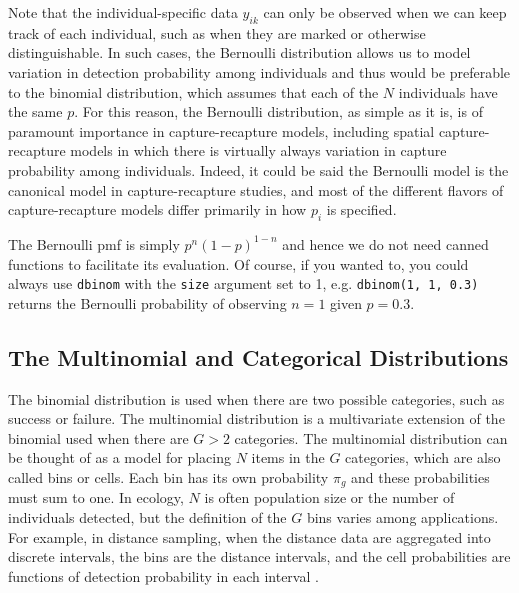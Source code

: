 Note that the individual-specific data $y_{ik}$ can only be
observed when we can keep track of each individual, such as when they
are marked or otherwise distinguishable.
In such cases, the Bernoulli distribution allows us to
model variation in detection probability among individuals and thus
would be preferable to the binomial distribution, which assumes that each
of the $N$ individuals have the same $p$.
For this reason, the Bernoulli
distribution, as simple as it is, is of paramount importance in
capture-recapture models, including spatial capture-recapture models
in which there is virtually always variation in capture probability
among individuals. Indeed, it could be said the Bernoulli model is the
canonical model in capture-recapture studies, and most of the
different flavors of capture-recapture models differ primarily in how $p_i$ is
specified. %

The Bernoulli pmf is simply $p^n(1-p)^{1-n}$ and hence we do not need canned
functions to facilitate its evaluation. Of course, if you wanted to, you
could always use \verb+dbinom+ with the \verb+size+ argument set to
1, e.g. \verb+dbinom(1, 1, 0.3)+ returns the Bernoulli probability of
observing $n=1$ given $p=0.3$.

\subsection{The Multinomial and Categorical Distributions}
\label{modeling.sec.multinom}

The binomial distribution is used
when there are two possible categories, such as success or failure.
The multinomial distribution is a multivariate extension of
the binomial used when there are $G>2$ categories.
The multinomial distribution can be thought of as a model for placing
$N$ items in the $G$ categories, which are also called bins or cells. Each bin has
its own probability $\pi_g$ and these probabilities must sum to one.
In ecology, $N$ is often population size or the number of individuals
detected, but the definition of the $G$ bins varies among
applications. For example, in distance sampling, when the distance
data are aggregated into discrete intervals,
the bins are the distance intervals, and the cell probabilities are
functions of detection probability in each interval \citep{royle_etal:2004}.

